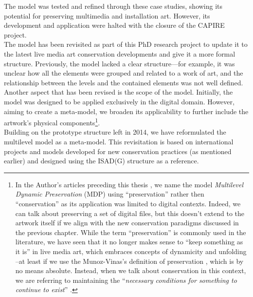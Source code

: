 The model was tested and refined through these case studies, showing its potential for preserving multimedia and installation art. However, its development and application were halted with the closure of the CAPIRE project.\\
The model has been revisited as part of this PhD research project to update it to the latest live media art conservation developments and give it a more formal structure. Previously, the model lacked a clear structure—for example, it was unclear how all the elements were grouped and related to a work of art, and the relationship between the levels and the contained elements was not well defined. Another aspect that has been revised is the scope of the model. Initially, the model was designed to be applied exclusively in the digital domain. However, aiming to create a meta-model, we broaden its applicability to further include the artwork's physical components\footnote{In the Author’s articles preceding this thesis \cite{fiordelmondo2023toward, fiordelmondo2023multilevel, fiordelmondo2024reactivating, fiordelmondo2024nime}, we name the model \textit{Multilevel Dynamic Preservation} (MDP) using ``preservation'' rather then ``conservation'' as its application was limited to digital contexts. Indeed, we can talk about preserving a set of digital files, but this doesn’t extend to the artwork itself if we align with the new conservation paradigms discussed in the previous chapter. While the term ``preservation'' is commonly used in the literature, we have seen that it no longer makes sense to ``keep something as it is'' in live media art, which embraces concepts of dynamicity and unfolding –at least if we use the Munoz-Vinas’s definition of preservation \cite{munoz2005contemporary}, which is by no means absolute. Instead, when we talk about conservation in this context, we are referring to maintaining the ``\textit{necessary conditions for something to continue to exist}'' \cite{castriota2019authenticity}.}.\\
Building on the prototype structure left in 2014, we have reformulated the multilevel model as a meta-model. This revisitation is based on international projects and models developed for new conservation practices (as mentioned earlier) and designed using the ISAD(G) structure as a reference.

